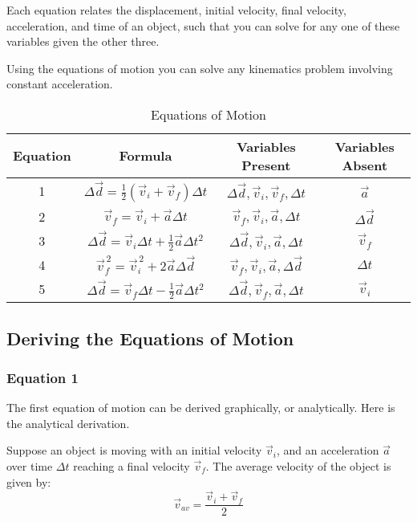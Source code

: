 \documentclass{article}
\begin{document}
Each equation relates the displacement, initial velocity, final velocity, acceleration, and time of an object, such that you can solve for any one of these variables given the other three.

Using the equations of motion you can solve any kinematics problem involving constant acceleration.

\begin{table}[h]
    \centering
    \begin{tabular}{|c|c|c|c|}
    \hline
    \textbf{Equation} & \textbf{Formula} & \textbf{Variables Present} & \textbf{Variables Absent} \\
    \hline
    1 & \(\Delta \vec{d} = \frac{1}{2}(\vec{v}_i + \vec{v}_f)\Delta t\) & \(\Delta \vec{d}, \vec{v}_i, \vec{v}_f, \Delta t\) & \(\vec{a}\) \\
    \hline
    2 & \(\vec{v}_f = \vec{v}_i + \vec{a}\Delta t\) & \(\vec{v}_f, \vec{v}_i, \vec{a}, \Delta t\) & \(\Delta \vec{d}\) \\
    \hline
    3 & \(\Delta \vec{d} = \vec{v}_i\Delta t + \frac{1}{2}\vec{a}\Delta t^2\) & \(\Delta \vec{d}, \vec{v}_i, \vec{a}, \Delta t\) & \(\vec{v}_f\) \\
    \hline
    4 & \(\vec{v}_f^{\,2} = \vec{v}_i^{\,2} + 2\vec{a}\Delta \vec{d}\) & \(\vec{v}_f, \vec{v}_i, \vec{a}, \Delta \vec{d}\) & \(\Delta t\) \\
    \hline
    5 & \(\Delta \vec{d} = \vec{v}_f\Delta t - \frac{1}{2}\vec{a}\Delta t^2\) & \(\Delta \vec{d}, \vec{v}_f, \vec{a}, \Delta t\) & \(\vec{v}_i\) \\
    \hline
    \end{tabular}
    \caption{Equations of Motion}
    \label{table:equations_of_motion}
    \end{table}
    

\subsection{Deriving the Equations of Motion}


\subsubsection{Equation 1}
The first equation of motion can be derived graphically, or analytically. Here is the analytical derivation.

Suppose an object is moving with an initial velocity $\vec{v}_i$, and an acceleration $\vec{a}$ over time $\Delta t$ reaching a final velocity $\vec{v}_f$. The average velocity of the object is given by:
\begin{equation}
    \vec{v}_{av} = \frac{\vec{v}_i + \vec{v}_f}{2}
\end{equation}
\end{document}
